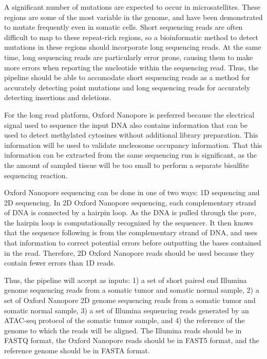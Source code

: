 A significant number of mutations are expected to occur in microsatellites.
These regions are some of the most variable in the genome, and have been demonstrated to mutate frequently even in somatic cells.
Short sequencing reads are often difficult to map to these repeat-rich regions, so a bioinformatic method to detect mutations in these regions should incorporate long sequencing reads. At the same time, long sequencing reads are particularly error prone, causing them to make more errors when reporting the nucleotide within the sequencing read. Thus, the pipeline should be able to accomodate short sequencing reads as a method for accurately detecting point mutations and long sequencing reads for accurately detecting insertions and deletions.

For the long read platform, Oxford Nanopore is preferred because the electrical signal used to sequence the input DNA also contains information that can be used to detect methylated cytosines without additional library preparation. This information will be used to validate nucleosome occupancy information. That this information can be extracted from the same sequencing run is significant, as the the amount of sampled tissue will be too small to perform a separate bisulfite sequencing reaction.

Oxford Nanopore sequencing can be done in one of two ways: 1D sequencing and 2D sequencing.
In 2D Oxford Nanopore sequencing, each complementary strand of DNA is connected by a hairpin loop. As the DNA is pulled through the pore, the hairpin loop is computationally recognized by the sequencer. It then knows that the sequence following is from the complementary strand of DNA, and uses that information to correct potential errors before outputting the bases contained in the read.
Therefore, 2D Oxford Nanopore reads should be used because they contain fewer errors than 1D reads.

Thus, the pipeline will accept as inputs: 1) a set of short paired end Illumina genome sequencing reads from a somatic tumor and somatic normal sample, 2) a set of Oxford Nanopore 2D genome sequencing reads from a somatic tumor and somatic normal sample, 3) a set of Illumina sequencing reads generated by an ATAC-seq protocol of the somatic tumor sample, and 4) the reference of the genome to which the reads will be aligned. The Illumina reads should be in FASTQ format, the Oxford Nanopore reads should be in FAST5 format, and the reference genome should be in FASTA format.

